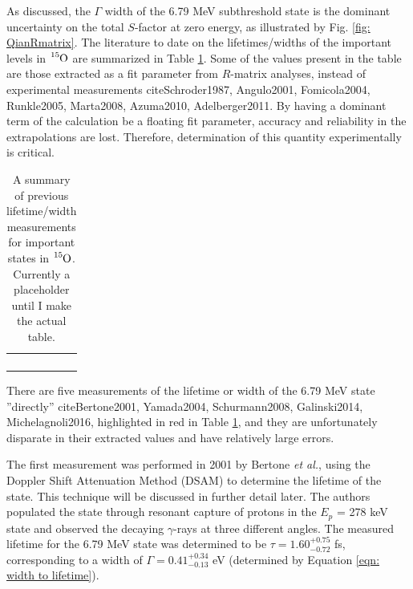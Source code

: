 As discussed, the $\Gamma$ width of the 6.79 MeV subthreshold state is the dominant uncertainty on the total $S$-factor at zero energy, as illustrated by Fig. \ref{fig: QianRmatrix}. The literature to date on the lifetimes/widths of the important levels in $\ce{^{15}O}$ are summarized in Table \ref{table: lifetimes}. Some of the values present in the table are those extracted as a fit parameter from $R$-matrix analyses, instead of experimental measurements cite{Schroder1987, Angulo2001, Fomicola2004, Runkle2005, Marta2008, Azuma2010, Adelberger2011}. By having a dominant term of the calculation be a floating fit parameter, accuracy and reliability in the extrapolations are lost. Therefore, determination of this quantity experimentally is critical. 


 \begin{table}[]
\begin{tabular}{lllll}
 &  &  &  &  \\
 &  &  &  &  \\
 &  &  &  &  \\
 &  &  &  & 
\end{tabular}
\label{table: lifetimes}
\caption{A summary of previous lifetime/width measurements for important states in $\ce{^{15}O}$. Currently a placeholder until I make the actual table.}
\end{table}

There are five measurements of the lifetime or width of the 6.79 MeV state ''directly'' cite{Bertone2001, Yamada2004, Schurmann2008, Galinski2014, Michelagnoli2016}, highlighted in red in Table \ref{table: lifetimes}, and they are unfortunately disparate in their extracted values and have relatively large errors. 

The first measurement was performed in 2001 by Bertone \textit{et al.}, using the Doppler Shift Attenuation Method (DSAM) to determine the lifetime of the state. This technique will be discussed in further detail later. The authors populated the state through resonant capture of protons in the $E_{p}$ = 278 keV state and observed the decaying $\gamma$-rays at three different angles. The measured lifetime for the 6.79 MeV state was determined to be $\tau = 1.60^{+0.75}_{-0.72}$ fs, corresponding to a width of $\Gamma = 0.41^{+0.34}_{-0.13}$ eV (determined by Equation \ref{eqn: width to lifetime}). 

